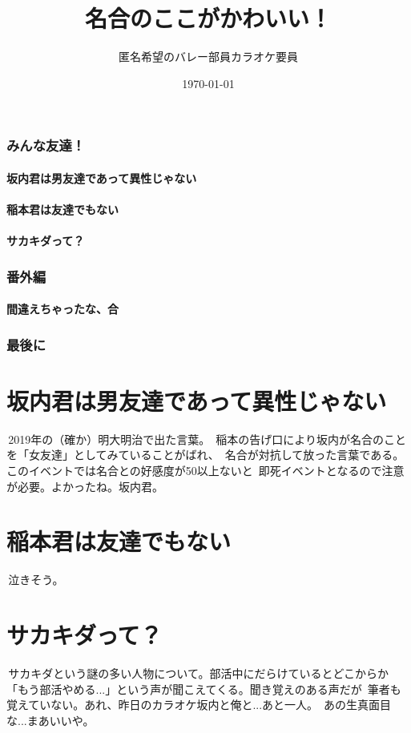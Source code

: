 \documentclass[11pt]{jsarticle}
\title{名合のここがかわいい！}
\author{匿名希望のバレー部員カラオケ要員}
\date{\today}
\begin{document}
\maketitle

\section{みんな友達！}
\subsection{坂内君は男友達であって異性じゃない}
\subsection{稲本君は友達でもない}
\subsection{サカキダって？}
\section{番外編}
\subsection{間違えちゃったな、合}
\section{最後に}


\newpage
\part{坂内君は男友達であって異性じゃない}
\,2019年の（確か）明大明治で出た言葉。
\,稲本の告げ口により坂内が名合のことを「女友達」としてみていることがばれ、
\,名合が対抗して放った言葉である。このイベントでは名合との好感度が50以上ないと
\,即死イベントとなるので注意が必要。よかったね。坂内君。
\newpage
\part{稲本君は友達でもない}
\,泣きそう。
\newpage
\part{サカキダって？}
\,サカキダという謎の多い人物について。部活中にだらけているとどこからか
\,「もう部活やめる...」という声が聞こえてくる。聞き覚えのある声だが
\,筆者も覚えていない。あれ、昨日のカラオケ坂内と俺と...あと一人。
\,あの生真面目な...まあいいや。
\newpage
\end{document}
